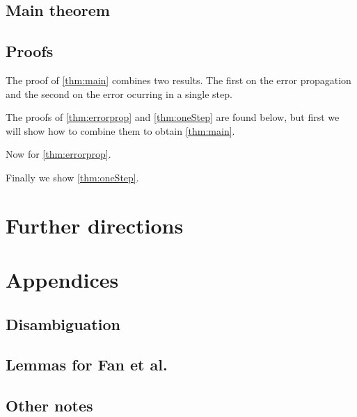 \documentclass{article}
\begin{document}
\subsection{Main theorem}

\subsection{Proofs}
The proof of \cref{thm:main} combines two results.
The first on the error propagation and the second on the error
ocurring in a single step.


The proofs of \cref{thm:errorprop} and \cref{thm:oneStep} are
found below, but first 
we will show how to combine them to obtain
\cref{thm:main}.

Now for \cref{thm:errorprop}.

Finally we show \cref{thm:oneStep}.


\section{Further directions}


\section{Appendices}
\subsection{Disambiguation}

\subsection{Lemmas for Fan et al.}

\subsection{Other notes}




{}
\end{document}
